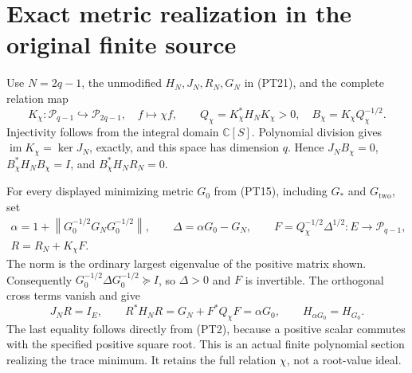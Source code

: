 \documentclass[11pt]{article}
\newcommand{\C}{\mathbb C}
\newcommand{\PP}{\mathcal P}
\newcommand{\norm}[1]{\left\lVert#1\right\rVert}
\DeclareMathOperator{\im}{im}
\begin{document}
\section{Exact metric realization in the original finite source}

Use \(N=2q-1\), the unmodified \(H_N,J_N,R_N,G_N\) in
(PT21), and the complete relation map
\begin{equation}\tag{PT27}
 K_\chi:\PP_{q-1}\hookrightarrow\PP_{2q-1},\quad
 f\mapsto\chi f,\qquad
 Q_\chi=K_\chi^*H_NK_\chi>0,\quad
 B_\chi=K_\chi Q_\chi^{-1/2}.
\end{equation}
Injectivity follows from the integral domain \(\C[S]\).
Polynomial division gives \(\im K_\chi=\ker J_N\), exactly,
and this space has dimension \(q\). Hence
\(J_NB_\chi=0\), \(B_\chi^*H_NB_\chi=I\), and
\(B_\chi^*H_NR_N=0\).

For every displayed minimizing metric \(G_0\) from (PT15),
including \(G_*\) and \(G_{\mathrm{two}}\), set
\begin{equation}\tag{PT28}
 \begin{gathered}
 \alpha=1+\norm{G_0^{-1/2}G_NG_0^{-1/2}},\qquad
 \Delta=\alpha G_0-G_N,\qquad
 F=Q_\chi^{-1/2}\Delta^{1/2}:E\longrightarrow\PP_{q-1},\\
 R=R_N+K_\chi F.
 \end{gathered}
\end{equation}
The norm is the ordinary largest eigenvalue of the positive matrix
shown. Consequently
\(G_0^{-1/2}\Delta G_0^{-1/2}\succeq I\), so \(\Delta>0\)
and \(F\) is invertible. The orthogonal cross terms vanish and give
\begin{equation}\tag{PT29}
 J_NR=I_E,\qquad R^*H_NR=G_N+F^*Q_\chi F
                         =\alpha G_0,\qquad
 H_{\alpha G_0}=H_{G_0}.
\end{equation}
The last equality follows directly from (PT2), because a positive
scalar commutes with the specified positive square root. This is
an actual finite polynomial section realizing the trace minimum.
It retains the full relation \(\chi\), not a root-value ideal.
\end{document}
